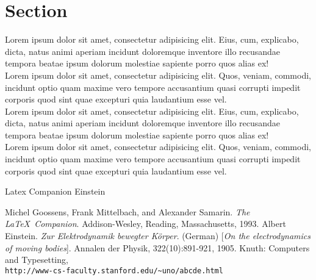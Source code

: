 \documentclass{article}
\begin{document}
\section{Section}
Lorem ipsum dolor sit amet, consectetur adipisicing elit. Eius, cum, explicabo, dicta, natus animi aperiam incidunt doloremque inventore illo recusandae tempora beatae ipsum dolorum molestiae sapiente porro quos alias ex!
\\ Lorem ipsum dolor sit amet, consectetur adipisicing elit. Quos, veniam, commodi, incidunt optio quam maxime vero tempore accusantium quasi corrupti impedit corporis quod sint quae excepturi quia laudantium esse vel.
\\ Lorem ipsum dolor sit amet, consectetur adipisicing elit. Eius, cum, explicabo, dicta, natus animi aperiam incidunt doloremque inventore illo recusandae tempora beatae ipsum dolorum molestiae sapiente porro quos alias ex!
\\ Lorem ipsum dolor sit amet, consectetur adipisicing elit. Quos, veniam, commodi, incidunt optio quam maxime vero tempore accusantium quasi corrupti impedit corporis quod sint quae excepturi quia laudantium esse vel.

Latex Companion \cite{latexcompanion} Einstein \cite{einstein}

\begin{thebibliography}{9}
 Michel Goossens, Frank Mittelbach, and Alexander Samarin. \textit{The \LaTeX\ Companion}. Addison-Wesley, Reading, Massachusetts, 1993.
 Albert Einstein. \textit{Zur Elektrodynamik bewegter K{\"o}rper}. (German) [\textit{On the electrodynamics of moving bodies}]. Annalen der Physik, 322(10):891-921, 1905.
 Knuth: Computers and Typesetting, \\\texttt{http://www-cs-faculty.stanford.edu/\~{}uno/abcde.html}
\end{thebibliography}
\end{document}
